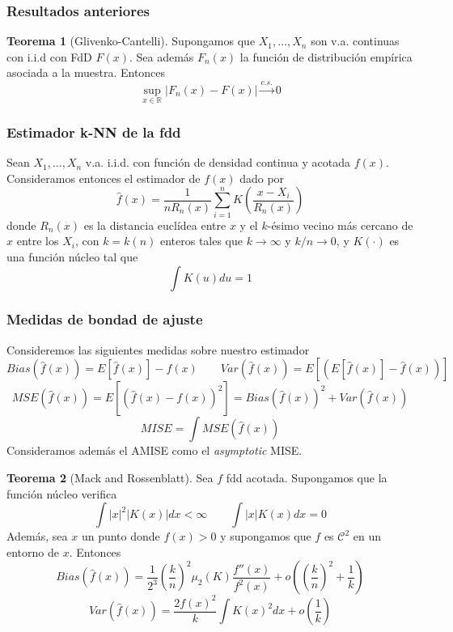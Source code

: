 \documentclass{beamer}
\theoremstyle{definition}
\newtheorem{teorema}{Teorema}
\newcommand{\R}{\mathbb{R}}
\begin{document}
\begin{frame}
\frametitle{Resultados anteriores}

\begin{teorema}[Glivenko-Cantelli]
Supongamos que $X_1,\dotsc,X_n$ son v.a. continuas con i.i.d con FdD $F(x)$. Sea además $F_n(x)$ la función de distribución empírica asociada a la muestra. Entonces
$$
\sup_{x\in \R}\lvert F_n(x)-F(x)\rvert \overset{c.s.}{\longrightarrow} 0
$$
\end{teorema}
\end{frame}

\begin{frame}
\frametitle{Estimador k-NN de la fdd}
Sean $X_1,\dotsc,X_n$ v.a. i.i.d. con función de densidad continua y acotada $f(x)$. Consideramos entonces el estimador de $f(x)$ dado por
$$
\hat{f}(x) = \frac{1}{nR_n(x)}\sum_{i=1}^n K\left(\frac{x-X_i}{R_n(x)}\right)
$$
donde $R_n(x)$ es la distancia euclídea entre $x$ y el $k$-ésimo vecino más cercano de $x$ entre los $X_i$, con $k=k(n)$  enteros tales que $k\to\infty$ y $k/n\to 0$, y $K(\cdot)$ es una función núcleo tal que 
$$
\int K(u)du=1
$$
\end{frame}


\begin{frame}
\frametitle{Medidas de bondad de ajuste}
Consideremos las siguientes medidas sobre nuestro estimador
$$
Bias(\hat{f}(x)) = E[\hat{f}(x)]-f(x) \qquad Var(\hat{f}(x)) = E\left[\left(E[\hat{f}(x)]-\hat{f}(x)\right)\right]
$$
$$
MSE(\hat{f}(x)) = E\left[(\hat{f}(x)-f(x))^2\right] = Bias(\hat{f}(x))^2 + Var(\hat{f}(x))
$$
$$
MISE = \int MSE(\hat{f}(x)) 
$$
Consideramos además el AMISE como el \textit{asymptotic} MISE.
\end{frame}


\begin{frame}
\begin{teorema}[Mack and Rossenblatt] Sea $f$ fdd acotada. Supongamos que la función núcleo verifica
$$
\int |x|^2 |K(x)|dx < \infty \qquad \int |x|K(x) dx = 0
$$
Además, sea $x$ un punto donde $f(x)>0$ y supongamos que $f$ es $\mathcal{C}^2$ en un entorno de $x$. Entonces
$$
Bias(\hat{f}(x)) = \frac{1}{2^3}\left(\frac{k}{n}\right)^2\mu_2(K)\frac{f''(x)}{f^2(x)}+o\left(\left(\frac{k}{n}\right)^2+\frac{1}{k}\right)
$$
$$
Var(\hat{f}(x)) = \frac{2f(x)^2}{k}\int K(x)^2 dx+o\left(\frac{1}{k}\right)
$$
\end{teorema}
\end{frame}
\end{document}
